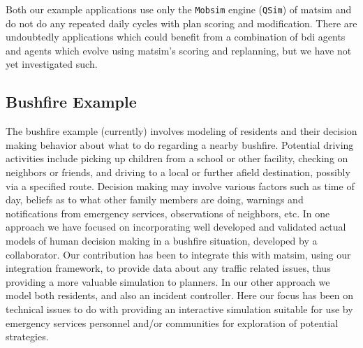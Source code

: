 %
Both our example applications use only the \lstinline{Mobsim} engine
(\lstinline{QSim}) of \gls{matsim} and do not do any repeated daily cycles
with plan scoring and modification. There are undoubtedly applications which
could benefit from a combination of \gls{bdi} agents and agents which evolve using
\gls{matsim}'s scoring and replanning, but we have not yet investigated such.

\subsection{Bushfire Example}
The bushfire example (currently) involves modeling of residents and
their decision making behavior about what to do regarding a nearby
bushfire. Potential driving activities include picking up children
from a school or other facility, checking on neighbors or friends,
and driving to a local or further afield destination, possibly via a
specified route. Decision making may involve various factors such as
time of day, beliefs as to what other family members are doing,
warnings and notifications from emergency services, observations of
neighbors, etc. In one approach we have focused on incorporating
well developed and validated actual models of human decision making in
a bushfire situation, developed by a collaborator. Our contribution
has been to integrate this with \gls{matsim}, using our integration
framework, to provide data about any traffic related issues, thus
providing a more valuable simulation to planners. In our other
approach we model both residents, and also an incident
controller. Here our focus has been on technical issues to do with
providing an interactive simulation suitable for use by emergency
services personnel and/or communities for exploration of potential
strategies. 


